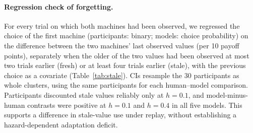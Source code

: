 \documentclass[letterpaper]{article} %
\begin{document}
\paragraph{Regression check of forgetting.} For every trial on which both machines had been observed, we regressed the choice of the first machine (participants: binary; models: choice probability) on the difference between the two machines' last observed values (per 10 payoff points), separately when the older of the two values had been observed at most two trials earlier (fresh) or at least four trials earlier (stale), with the previous choice as a covariate (Table~\ref{tab:stale}). CIs resample the 30 participants as whole clusters, using the same participants for each human--model comparison. Participants discounted stale values reliably only at $h=0.1$, and model-minus-human contrasts were positive at $h=0.1$ and $h=0.4$ in all five models. This supports a difference in stale-value use under replay, without establishing a hazard-dependent adaptation deficit.
\end{document}
